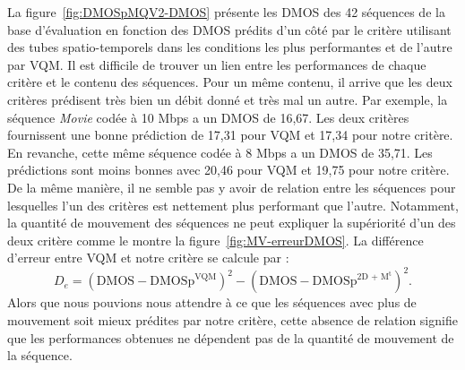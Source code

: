 La figure~\ref{fig:DMOSpMQV2-DMOS} présente les DMOS des 42 séquences de la base d'évaluation en fonction des DMOS prédits d'un côté par le critère utilisant des tubes spatio-temporels dans les conditions les plus performantes et de l'autre par VQM. Il est difficile de trouver un lien entre les performances de chaque critère et le contenu des séquences. Pour un même contenu, il arrive que les deux critères prédisent très bien un débit donné et très mal un autre. Par exemple, la séquence \emph{Movie} codée à 10 Mbps a un DMOS de 16,67. Les deux critères fournissent une bonne prédiction de 17,31 pour VQM et 17,34 pour notre critère. En revanche, cette même séquence codée à 8 Mbps a un DMOS de 35,71. Les prédictions sont moins bonnes avec 20,46 pour VQM et 19,75 pour notre critère. De la même manière, il ne semble pas y avoir de relation entre les séquences pour lesquelles l'un des critères est nettement plus performant que l'autre. Notamment, la quantité de mouvement des séquences ne peut expliquer la supériorité d'un des deux critère comme le montre la figure~\ref{fig:MV-erreurDMOS}. La différence d'erreur entre VQM et notre critère se calcule par :
\begin{equation}
D_e = \left(\text{DMOS} - \text{DMOSp}^{\text{VQM}}\right)^2 - \left(\text{DMOS} - \text{DMOSp}^{\text{2D + M$^\text{t}$}}\right)^2.
\end{equation}
%
Alors que nous pouvions nous attendre à ce que les séquences avec plus de mouvement soit mieux prédites par notre critère, cette absence de relation signifie que les performances obtenues ne dépendent pas de la quantité de mouvement de la séquence.

